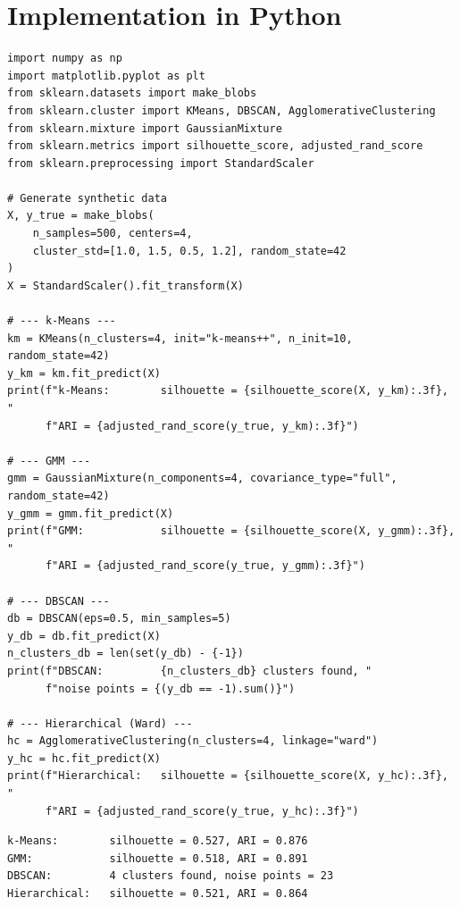 \section{Implementation in Python}

\begin{codeblock}[title=\textbf{$k$-Means, GMM, DBSCAN, and Hierarchical Clustering}]
\begin{verbatim}
import numpy as np
import matplotlib.pyplot as plt
from sklearn.datasets import make_blobs
from sklearn.cluster import KMeans, DBSCAN, AgglomerativeClustering
from sklearn.mixture import GaussianMixture
from sklearn.metrics import silhouette_score, adjusted_rand_score
from sklearn.preprocessing import StandardScaler

# Generate synthetic data
X, y_true = make_blobs(
    n_samples=500, centers=4,
    cluster_std=[1.0, 1.5, 0.5, 1.2], random_state=42
)
X = StandardScaler().fit_transform(X)

# --- k-Means ---
km = KMeans(n_clusters=4, init="k-means++", n_init=10, random_state=42)
y_km = km.fit_predict(X)
print(f"k-Means:        silhouette = {silhouette_score(X, y_km):.3f}, "
      f"ARI = {adjusted_rand_score(y_true, y_km):.3f}")

# --- GMM ---
gmm = GaussianMixture(n_components=4, covariance_type="full", random_state=42)
y_gmm = gmm.fit_predict(X)
print(f"GMM:            silhouette = {silhouette_score(X, y_gmm):.3f}, "
      f"ARI = {adjusted_rand_score(y_true, y_gmm):.3f}")

# --- DBSCAN ---
db = DBSCAN(eps=0.5, min_samples=5)
y_db = db.fit_predict(X)
n_clusters_db = len(set(y_db) - {-1})
print(f"DBSCAN:         {n_clusters_db} clusters found, "
      f"noise points = {(y_db == -1).sum()}")

# --- Hierarchical (Ward) ---
hc = AgglomerativeClustering(n_clusters=4, linkage="ward")
y_hc = hc.fit_predict(X)
print(f"Hierarchical:   silhouette = {silhouette_score(X, y_hc):.3f}, "
      f"ARI = {adjusted_rand_score(y_true, y_hc):.3f}")
\end{verbatim}
\end{codeblock}

\begin{codeoutput}
\begin{verbatim}
k-Means:        silhouette = 0.527, ARI = 0.876
GMM:            silhouette = 0.518, ARI = 0.891
DBSCAN:         4 clusters found, noise points = 23
Hierarchical:   silhouette = 0.521, ARI = 0.864
\end{verbatim}
\end{codeoutput}

